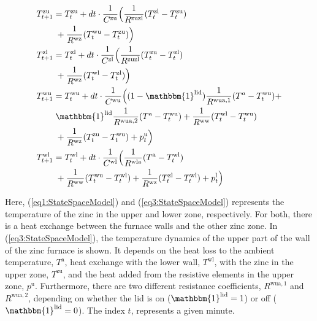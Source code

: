 \documentclass[lettersize,journal]{IEEEtran}
\begin{document}
\begin{subequations}\label{eq:StateSpaceModel}
    \begin{align}
        T^{\text{zu}}_{t+1} & = T^{\text{zu}}_{t} + dt \cdot \frac{1}{C^{\text{zu}}}\Bigl( \frac{1}{R^{\text{zuzl}}} (T^{\text{zl}}_{t} - T^{\text{zu}}_{t}) \notag                     \\ & \mspace{5mu} + \frac{1}{R^{\text{wz}}} (T^{\text{wu}}_{t} - T^{\text{zu}}_{t}) \Bigr) \label{eq1:StateSpaceModel} \\
        T^{\text{zl}}_{t+1} & = T^{\text{zl}}_{t} + dt \cdot \frac{1}{C^{\text{zl}}}\Bigl( \frac{1}{R^{\text{zuzl}}} (T^{\text{zu}}_{t} - T^{\text{zl}}_{t}) \notag                     \\ & \mspace{5mu} + \frac{1}{R^{\text{wz}}} (T^{\text{wl}}_{t} - T^{\text{zl}}_{t}) \Bigr) \label{eq2:StateSpaceModel} \\
        T^{\text{wu}}_{t+1} & = T^{\text{wu}}_{t} + dt \cdot \frac{1}{C^{\text{wu}}}\Bigl( (1-\mathbbm{1}^{\text{lid}}) \frac{1}{R^{\text{wua},1}} (T^{a} - T^{\text{wu}}_{t}) \notag + \\ & \mspace{5mu} \mathbbm{1}^{\text{lid}} \frac{1}{R^{\text{wua},2}} (T^{\text{a}} - T^{\text{wu}}_{t}) + \frac{1}{R^{\text{ww}}} (T^{\text{wl}}_{t} - T^{\text{wu}}_{t}) \notag \\ & \mspace{5mu} + \frac{1}{R^{\text{wz}}} (T^{\text{zu}}_{t} - T^{\text{wu}}_{t}) + p^{\text{u}}_{t} \Bigr) \label{eq3:StateSpaceModel} \\
        T^{\text{wl}}_{t+1} & = T^{\text{wl}}_{t} + dt \cdot \frac{1}{C^{\text{wl}}}\Bigl( \frac{1}{R^{\text{wla}}} (T^{\text{a}} - T^{\text{wl}}_{t}) \notag                           \\ & \mspace{5mu} + \frac{1}{R^{\text{ww}}} (T^{\text{wu}}_{t} - T^{\text{wl}}_{t}) + \frac{1}{R^{\text{wz}}} (T^{\text{zl}}_{t} - T^{\text{wl}}_{t}) + p^{\text{l}}_{t} \Bigr) \label{eq4:StateSpaceModel}
    \end{align}
\end{subequations}

Here, (\ref{eq1:StateSpaceModel}) and (\ref{eq3:StateSpaceModel}) represents the temperature of the zinc in the upper and lower zone, respectively. For both, there is a heat exchange between the furnace walls and the other zinc zone. In (\ref{eq3:StateSpaceModel}), the temperature dynamics of the upper part of the wall of the zinc furnace is shown. It depends on the heat loss to the ambient temperature, $T^{\text{a}}$, heat exchange with the lower wall, $T^{\text{wl}}$, with the zinc in the upper zone, $T^{\text{zu}}$, and the heat added from the resistive elements in the upper zone, $p^{\text{u}}$. Furthermore, there are two different resistance coefficients, $R^{\text{wua},1}$ and $R^{\text{wua},2}$, depending on whether the lid is on ($ \mathbbm{1}^{\text{lid}} = 1$) or off ($ \mathbbm{1}^{\text{lid}} = 0$). The index $t$, represents a given minute.
\end{document}
